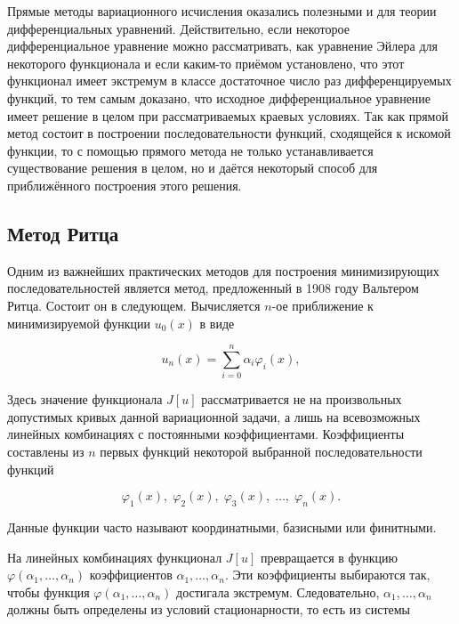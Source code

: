 \documentclass{article}
\begin{document}
Прямые методы вариационного исчисления оказались полезными и для теории дифференциальных уравнений. Действительно, если некоторое дифференциальное уравнение можно рассматривать, как уравнение Эйлера для некоторого функционала и если каким-то приёмом установлено, что этот функционал имеет экстремум в классе достаточное число раз дифференцируемых функций, то тем самым доказано, что исходное дифференциальное уравнение имеет решение в целом при рассматриваемых краевых условиях. Так как прямой метод состоит в построении последовательности функций, сходящейся к искомой функции, то с помощью прямого метода не только устанавливается существование решения в целом, но и даётся некоторый способ для приближённого построения этого решения.

\subsection{Метод Ритца}

Одним из важнейших практических методов для построения минимизирующих последовательностей является метод, предложенный в 1908 году Вальтером Ритца. Состоит он в следующем. Вычисляется $n$-ое приближение к минимизируемой функции $u_{0}(x)$ в виде

\begin{equation}
	u_{n}(x) = \sum_{i=0}^n \alpha_{i}\varphi_{i}(x),
\end{equation}

\noindent Здесь значение функционала $J[u]$ рассматривается не на произвольных допустимых кривых данной вариационной задачи, а лишь на всевозможных линейных комбинациях с постоянными коэффициентами. Коэффициенты составлены из $n$ первых функций некоторой выбранной последовательности функций

\begin{equation}
	\varphi_{1}(x), \; \varphi_{2}(x), \; \varphi_{3}(x), \; \ldots, \; \varphi_{n}(x).
\end{equation}

\begin{info}
	Данные функции часто называют координатными, базисными или финитными.
\end{info}

На линейных комбинациях функционал $J[u]$ превращается в функцию $\varphi(\alpha_{1}, \ldots, \alpha_{n})$ коэффициентов $\alpha_{1}, \ldots, \alpha_{n}$. Эти коэффициенты выбираются так, чтобы функция $\varphi(\alpha_{1}, \ldots, \alpha_{n})$ достигала экстремум. Следовательно, $\alpha_{1}, \ldots, \alpha_{n}$ должны быть определены из условий стационарности, то есть из системы
\end{document}
